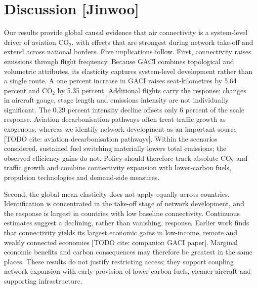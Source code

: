 \documentclass[12pt]{extarticle}
\begin{document}
\section*{Discussion [Jinwoo]}
Our results provide global causal evidence that air connectivity is a system-level driver of aviation CO$_2$, with effects that are strongest during network take-off and extend across national borders. Five implications follow. First, connectivity raises emissions through flight frequency. Because GACI combines topological and volumetric attributes, its elasticity captures system-level development rather than a single route. A one percent increase in GACI raises seat-kilometres by 5.64 percent and CO$_2$ by 5.35 percent. Additional flights carry the response; changes in aircraft gauge, stage length and emissions intensity are not individually significant. The 0.29 percent intensity decline offsets only 6 percent of the scale response. Aviation decarbonisation pathways often treat traffic growth as exogenous, whereas we identify network development as an important source [TODO cite: aviation decarbonisation pathways]. Within the scenarios considered, sustained fuel switching materially lowers total emissions; the observed efficiency gains do not. Policy should therefore track absolute CO$_2$ and traffic growth and combine connectivity expansion with lower-carbon fuels, propulsion technologies and demand-side measures.

Second, the global mean elasticity does not apply equally across countries. Identification is concentrated in the take-off stage of network development, and the response is largest in countries with low baseline connectivity. Continuous estimates suggest a declining, rather than vanishing, response. Earlier work finds that connectivity yields its largest economic gains in low-income, remote and weakly connected economies [TODO cite: companion GACI paper]. Marginal economic benefits and carbon consequences may therefore be greatest in the same places. These results do not justify restricting access; they support coupling network expansion with early provision of lower-carbon fuels, cleaner aircraft and supporting infrastructure.
\end{document}
